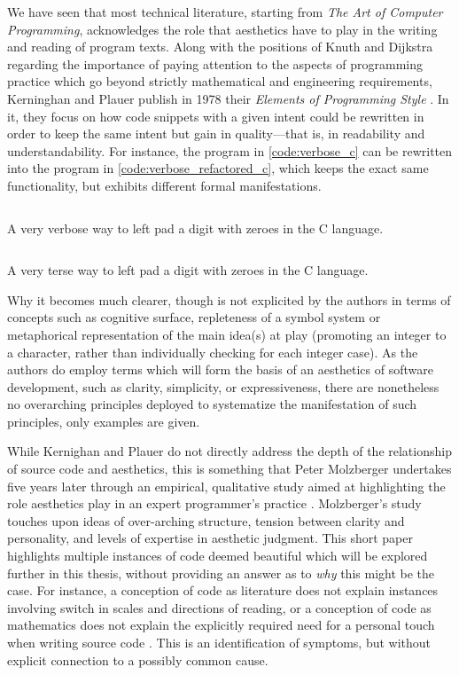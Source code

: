 We have seen that most technical literature, starting from \emph{The Art of Computer Programming}, acknowledges the role that aesthetics have to play in the writing and reading of program texts. Along with the positions of Knuth and Dijkstra regarding the importance of paying attention to the aspects of programming practice \citep{dijkstra_chapter_1972} which go beyond strictly mathematical and engineering requirements, Kerninghan and Plauer publish in 1978 their \emph{Elements of Programming Style} \citep{kernighan_elements_1978}. In it, they focus on how code snippets with a given intent could be rewritten in order to keep the same intent but gain in quality—that is, in readability and understandability. For instance, the program in \ref{code:verbose_c} can be rewritten into the program in \ref{code:verbose_refactored_c}, which keeps the exact same functionality, but exhibits different formal manifestations.

\begin{listing}
    \inputminted{c}{./corpus/verbose.c}
    \caption{A very verbose way to left pad a digit with zeroes in the C language.}
    \label{code:verbose_c}
\end{listing}

\begin{listing}
    \inputminted{c}{./corpus/verbose_refactored.c}
    \caption{A very terse way to left pad a digit with zeroes in the C language.}
    \label{code:verbose_refactored_c}
\end{listing}

Why it becomes much clearer, though is not explicited by the authors in terms of concepts such as cognitive surface, repleteness of a symbol system or metaphorical representation of the main idea(s) at play (promoting an integer to a character, rather than individually checking for each integer case). As the authors do employ terms which will form the basis of an aesthetics of software development, such as clarity, simplicity, or expressiveness, there are nonetheless no overarching principles deployed to systematize the manifestation of such principles, only examples are given.

While Kernighan and Plauer do not directly address the depth of the relationship of source code and aesthetics, this is something that Peter Molzberger undertakes five years later through an empirical, qualitative study aimed at highlighting the role aesthetics play in an expert programmer's practice \citep{molzberger_aesthetics_1983}. Molzberger's study touches upon ideas of over-arching structure, tension between clarity and personality, and levels of expertise in aesthetic judgment. This short paper highlights multiple instances of code deemed beautiful which will be explored further in this thesis, without providing an answer as to \emph{why} this might be the case. For instance, a conception of code as literature does not explain instances involving switch in scales and directions of reading, or a conception of code as mathematics does not explain the explicitly required need for a personal touch when writing source code \citep{molzberger_aesthetics_1983}. This is an identification of symptoms, but without explicit connection to a possibly common cause.


